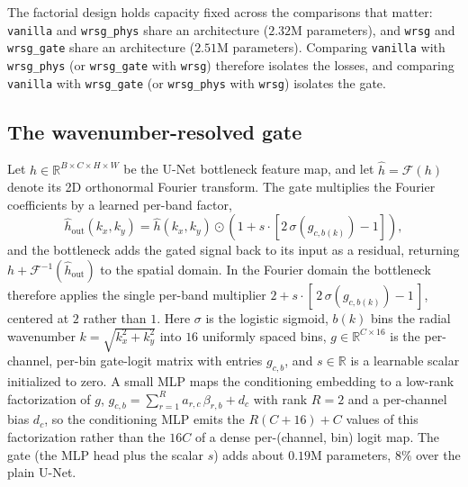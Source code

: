 \documentclass[10pt]{article} %
\begin{document}
The factorial design holds capacity fixed across the comparisons that matter: \texttt{vanilla} and \texttt{wrsg\_phys} share an architecture ($2.32$M parameters), and \texttt{wrsg} and \texttt{wrsg\_gate} share an architecture ($2.51$M parameters). Comparing \texttt{vanilla} with \texttt{wrsg\_phys} (or \texttt{wrsg\_gate} with \texttt{wrsg}) therefore isolates the losses, and comparing \texttt{vanilla} with \texttt{wrsg\_gate} (or \texttt{wrsg\_phys} with \texttt{wrsg}) isolates the gate.

\subsection{The wavenumber-resolved gate}
\label{sec:gate}

Let $h \in \mathbb{R}^{B \times C \times H \times W}$ be the U-Net bottleneck feature map, and let $\hat{h} = \mathcal{F}(h)$ denote its 2D orthonormal Fourier transform. The gate multiplies the Fourier coefficients by a learned per-band factor,
\begin{equation}
\hat{h}_{\text{out}}(k_x, k_y) = \hat{h}(k_x, k_y) \odot \left(1 + s \cdot \left[ 2\,\sigma(g_{c, b(k)}) - 1 \right]\right),
\label{eq:gate}
\end{equation}
and the bottleneck adds the gated signal back to its input as a residual, returning $h + \mathcal{F}^{-1}(\hat{h}_{\text{out}})$ to the spatial domain. In the Fourier domain the bottleneck therefore applies the single per-band multiplier $2 + s \cdot [\,2\,\sigma(g_{c, b(k)}) - 1\,]$, centered at $2$ rather than $1$. Here $\sigma$ is the logistic sigmoid, $b(k)$ bins the radial wavenumber $k = \sqrt{k_x^2 + k_y^2}$ into $16$ uniformly spaced bins, $g \in \mathbb{R}^{C \times 16}$ is the per-channel, per-bin gate-logit matrix with entries $g_{c,b}$, and $s \in \mathbb{R}$ is a learnable scalar initialized to zero. A small MLP maps the conditioning embedding to a low-rank factorization of $g$, $g_{c,b} = \sum_{r=1}^{R} a_{r,c}\,\beta_{r,b} + d_c$ with rank $R = 2$ and a per-channel bias $d_c$, so the conditioning MLP emits the $R(C+16)+C$ values of this factorization rather than the $16C$ of a dense per-(channel, bin) logit map. The gate (the MLP head plus the scalar $s$) adds about $0.19$M parameters, $8\%$ over the plain U-Net.
\end{document}
